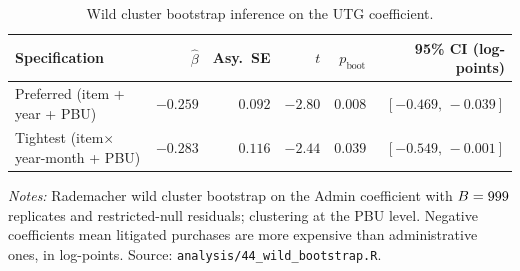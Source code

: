 \begin{table}[ht]
\centering
\caption{Wild cluster bootstrap inference on the UTG coefficient.}
\label{tab:utg_boottest}
\begin{threeparttable}
\begin{tabular}{lrrrrr}
\toprule
Specification & $\hat\beta$ & Asy.\ SE & $t$ & $p_{\text{boot}}$ & 95\% CI (log-points) \\
\midrule
Preferred (item + year + PBU)        & $-0.259$ & $0.092$ & $-2.80$ & $0.008$ & $[-0.469,\,-0.039]$ \\
Tightest (item$\times$year-month + PBU) & $-0.283$ & $0.116$ & $-2.44$ & $0.039$ & $[-0.549,\,-0.001]$ \\
\bottomrule
\end{tabular}
\begin{tablenotes}[flushleft]\footnotesize
\item \textit{Notes:} Rademacher wild cluster bootstrap on the Admin
coefficient with $B=999$ replicates and restricted-null
residuals; clustering at the PBU level. Negative coefficients mean
litigated purchases are more expensive than administrative ones, in
log-points. Source: \texttt{analysis/44\_wild\_bootstrap.R}.
\end{tablenotes}
\end{threeparttable}
\end{table}
